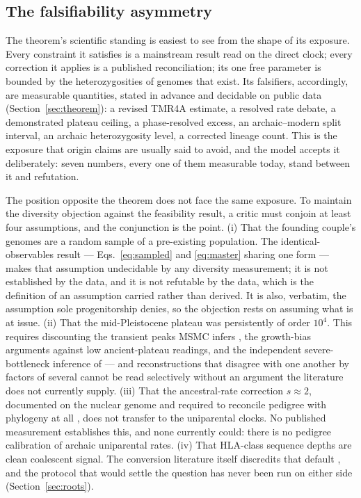 \subsection{The falsifiability asymmetry}\label{sec:asymmetry}
The theorem's scientific standing is easiest to see from the shape of its
exposure. Every constraint it satisfies is a mainstream result read on
the direct clock; every correction it applies is a published
reconciliation; its one free parameter is bounded by the heterozygosities
of genomes that exist. Its falsifiers, accordingly, are measurable
quantities, stated in advance and decidable on public data
(Section~\ref{sec:theorem}): a revised TMR4A estimate, a resolved rate
debate, a demonstrated plateau ceiling, a phase-resolved excess, an
archaic--modern split interval, an archaic heterozygosity level, a
corrected lineage count. This is the exposure that origin claims are
usually said to avoid, and the model accepts it deliberately: seven
numbers, every one of them measurable today, stand between it and
refutation.

The position opposite the theorem does not face the same exposure. To
maintain the diversity objection against the feasibility result, a critic
must conjoin at least four assumptions, and the conjunction is the point.
(i) That the founding couple's genomes are a random sample of a
pre-existing population. The identical-observables result --- Eqs.~\eqref{eq:sampled}
and \eqref{eq:master} sharing one form --- makes that assumption
undecidable by any diversity measurement; it is not established by the
data, and it is not refutable by the data, which is the definition of an
assumption carried rather than derived. It is also, verbatim, the
assumption sole progenitorship denies, so the objection rests on assuming
what is at issue. (ii) That the mid-Pleistocene plateau was persistently
of order $10^{4}$. This requires discounting the transient peaks MSMC
infers \citep{LiDurbin2011,SchiffelsDurbin2014}, the growth-bias
arguments against low ancient-plateau readings, and the independent
severe-bottleneck inference of \citet{Hu2023} --- and reconstructions
that disagree with one another by factors of several cannot be read
selectively without an argument the literature does not currently supply.
(iii) That the ancestral-rate correction $s \approx 2$, documented on the
nuclear genome and required to reconcile pedigree with phylogeny at all
\citep{Scally2012}, does not transfer to the uniparental clocks. No
published measurement establishes this, and none currently could: there
is no pedigree calibration of archaic uniparental rates. (iv) That
HLA-class sequence depths are clean coalescent signal. The conversion
literature itself discredits that default \citep{GarriganHedrick2003},
and the protocol that would settle the question has never been run on
either side (Section~\ref{sec:roots}).

